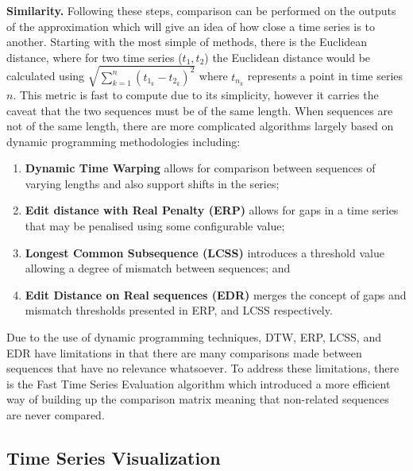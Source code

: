 \noindent\textbf{Similarity.}
Following these steps, comparison can be performed on the outputs of the approximation which will give an idea of how close a time series is to another.
Starting with the most simple of methods, there is the Euclidean distance, where for two time series ($t_1, t_2$) the Euclidean distance would be calculated using $\sqrt{\sum_{k=1}^{n}(t_{1_k} - t_{2_k})^2}$ where $t_{n_k}$ represents a point in time series $n$. 
This metric is fast to compute due to its simplicity, however it carries the caveat that the two sequences must be of the same length.
When sequences are not of the same length, there are more complicated algorithms largely based on dynamic programming methodologies including:
\begin{enumerate}
\item \textbf{Dynamic Time Warping} \cite{berndt1994using} allows for comparison between sequences of varying lengths and also support shifts in the series; 
\item \textbf{Edit distance with Real Penalty (ERP)} allows for gaps in a time series that may be penalised using some configurable value;
\item \textbf{Longest Common Subsequence (LCSS)} \cite{vlachos2003indexing} introduces a threshold value allowing a degree of mismatch between sequences; and 
\item \textbf{Edit Distance on Real sequences (EDR)}  \cite{chen2005robust} merges the concept of gaps and mismatch thresholds presented in ERP, and LCSS respectively.
\end{enumerate}

Due to the use of dynamic programming techniques, DTW, ERP, LCSS, and EDR have limitations in that there are many comparisons made between sequences that have no relevance whatsoever.
To address these limitations, there is the Fast Time Series Evaluation \cite{morse2007efficient} algorithm which introduced a more efficient way of building up the comparison matrix meaning that non-related sequences are never compared.

\subsection{Time Series Visualization}

